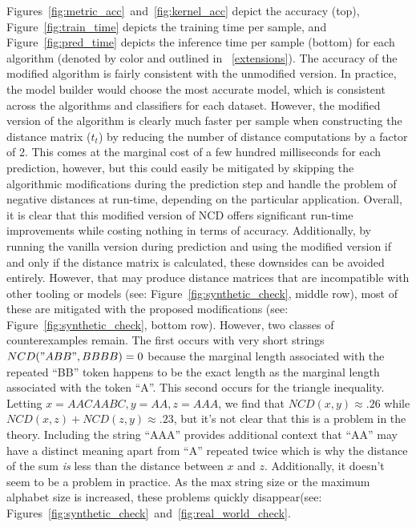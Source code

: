 \documentclass[conference]{IEEEtran}
\begin{document}
Figures~\ref{fig:metric_acc}~and~\ref{fig:kernel_acc} depict the accuracy (top), Figure~\ref{fig:train_time} depicts the   training time per sample, and Figure~\ref{fig:pred_time}  depicts the inference time per sample (bottom) for each algorithm (denoted by color and outlined in ~\ref{extensions}). 
The accuracy of the modified algorithm is fairly consistent with the unmodified version. 
In practice, the model builder would choose the most accurate model, which is consistent across the algorithms and classifiers for each dataset. 
However, the modified version of the algorithm is clearly much faster per sample when constructing the distance matrix ($t_t$) by reducing the number of distance computations by a factor of 2. 
This comes at the marginal cost of a few hundred milliseconds for each prediction, however, but this could easily be mitigated by skipping the algorithmic modifications during the prediction step and handle the problem of negative distances at run-time, depending on the particular application. 
Overall, it is clear that this modified version of NCD offers significant run-time improvements while costing nothing in terms of accuracy. 
Additionally, by running the vanilla version during prediction and using the modified version if and only if the distance matrix is calculated, these downsides can be avoided entirely. 
However, that may produce distance matrices that are incompatible with other tooling or models (see: Figure~\ref{fig:synthetic_check}, middle row), most of these are mitigated with the proposed modifications (see: Figure~\ref{fig:synthetic_check}, bottom row). 
However, two classes of counterexamples remain. 
The first occurs with very short strings
$NCD("ABB", BBBB) =0$ because the marginal length associated with the repeated ``BB'' token happens to be the exact length as the marginal length associated with the token ``A''. 
This second occurs for the triangle inequality. 
Letting $x =AACAABC, y = AA,
z=AAA$, we find that $NCD(x,y) \approx .26$ while $NCD(x,z) + NCD(z,y) \approx .23$, but it's not clear that this is a problem in the theory. Including the string ``AAA'' provides additional context that ``AA'' may have a distinct meaning apart from ``A'' repeated twice which is why the distance of the sum \textit{is} less than the distance between $x$ and $z$. Additionally, it doesn't seem to be a problem in practice. 
As the max string size or the maximum alphabet size is increased, these problems quickly disappear(see: Figures~\ref{fig:synthetic_check}~and~\ref{fig:real_world_check}.
\end{document}
